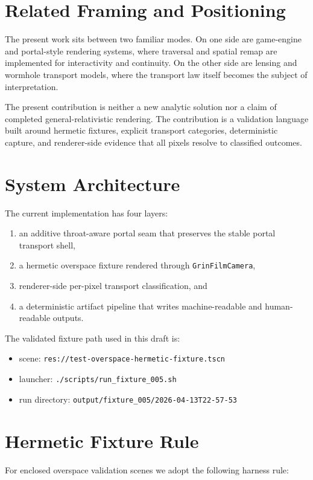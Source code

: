 \documentclass[11pt]{article}
\begin{document}
\section{Related Framing and Positioning}
The present work sits between two familiar modes. On one side are game-engine and portal-style rendering systems, where traversal and spatial remap are implemented for interactivity and continuity. On the other side are lensing and wormhole transport models, where the transport law itself becomes the subject of interpretation.

The present contribution is neither a new analytic solution nor a claim of completed general-relativistic rendering. The contribution is a validation language built around hermetic fixtures, explicit transport categories, deterministic capture, and renderer-side evidence that all pixels resolve to classified outcomes.

\section{System Architecture}
The current implementation has four layers:
\begin{enumerate}[leftmargin=1.5em]
\item an additive throat-aware portal seam that preserves the stable portal transport shell,
\item a hermetic overspace fixture rendered through \texttt{GrinFilmCamera},
\item renderer-side per-pixel transport classification, and
\item a deterministic artifact pipeline that writes machine-readable and human-readable outputs.
\end{enumerate}

The validated fixture path used in this draft is:
\begin{itemize}[leftmargin=1.5em]
\item scene: \texttt{res://test-overspace-hermetic-fixture.tscn}
\item launcher: \texttt{./scripts/run\_fixture\_005.sh}
\item run directory: \texttt{output/fixture\_005/2026-04-13T22-57-53}
\end{itemize}

\section{Hermetic Fixture Rule}
For enclosed overspace validation scenes we adopt the following harness rule:
\end{document}
